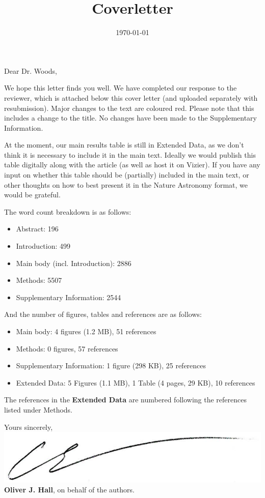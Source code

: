 \documentclass[11pt, a4paper, sans, colorlinks, linkcolor=True]{moderncv}
\title{Coverletter}
\begin{document}
\hypersetup{urlcolor=links}
\recipient{\ }{\ }
\date{\today}
\opening{Dear Dr. Woods,}
\makelettertitle
\justify
\vspace{-0.5cm}

We hope this letter finds you well. We have completed our response to the reviewer, which is attached below this cover letter (and uploaded separately with resubmission). Major changes to the text are coloured red. Please note that this includes a change to the title. No changes have been made to the Supplementary Information.

At the moment, our main results table is still in Extended Data, as we don't think it is necessary to include it in the main text. Ideally we would publish this table digitally along with the article (as well as host it on Vizier). If you have any input on whether this table should be (partially) included in the main text, or other thoughts on how to best present it in the Nature Astronomy format, we would be grateful.

The word count breakdown is as follows:
\begin{itemize}
	\item Abstract: 196
	\item Introduction: 499
	\item Main body (incl. Introduction): 2886
	\item Methods: 5507
	\item Supplementary Information: 2544
\end{itemize}

And the number of figures, tables and references are as follows:
\begin{itemize}
	\item Main body: 4 figures (1.2 MB), 51 references
	\item Methods: 0 figures, 57 references
	\item Supplementary Information: 1 figure (298 KB), 25 references
	\item Extended Data: 5 Figures (1.1 MB), 1 Table (4 pages, 29 KB), 10 references
\end{itemize}

The references in the \textbf{Extended Data} are numbered following the references listed under Methods.
\vspace{0.5cm}

Yours sincerely, \\
\vspace{0.5em}
\includegraphics[scale=0.2]{signature.png} \\ 
\vspace{0.5em}
\textbf{Oliver J. Hall}, on behalf of the authors. \\
\end{document}
